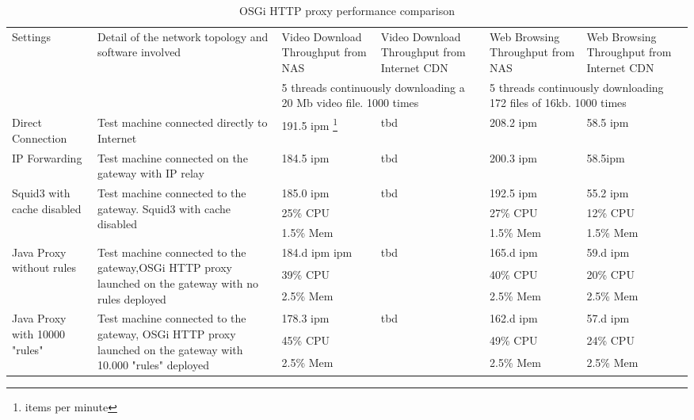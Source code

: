\begin{table*}
	\centering
	\begin{tabular}{|p{}|p{}||p{}|p{}|p{}|p{}|}
		\hline
		\multirow{2}{0.10\textwidth}{Settings} & \multirow{2}{0.35\textwidth}{Detail of the network topology and software involved}   & Video Download Throughput from NAS & Video Download Throughput from Internet CDN      & Web Browsing Throughput from NAS & Web Browsing Throughput from Internet CDN \\ \cline{3-6}
		 & & \multicolumn{2}{m{0.20\textwidth}|}{5 threads continuously downloading a 20 Mb video file. 1000 times} & \multicolumn{2}{m{0.20\textwidth}|}{5 threads continuously downloading 172 files of 16kb. 1000 times}\\\hline\hline
		Direct Connection & Test machine connected directly to Internet & 191.5 ipm \footnote{items per minute} & tbd & 208.2 ipm & 58.5 ipm \\\hline
		IP Forwarding  & Test machine connected on the gateway with IP relay & 184.5 ipm & tbd & 200.3 ipm & 58.5ipm\\\hline
		\multirow{3}{0.10\textwidth}{Squid3 with cache disabled} & \multirow{3}{0.35\textwidth}{
		Test machine connected to the gateway. Squid3 with cache disabled} &185.0 ipm & \multirow{3}{*}{tbd} & 192.5 ipm & 55.2 ipm \\
		 & & 25\% CPU & & 27\% CPU & 12\% CPU \\
		 & & 1.5\% Mem & & 1.5\% Mem & 1.5\% Mem \\\hline
		
		\multirow{3}{0.10\textwidth}{Java Proxy without rules} & \multirow{3}{0.35\textwidth}{
		Test machine connected to the gateway,OSGi HTTP proxy launched on the gateway with no rules deployed} &184.d ipm ipm & \multirow{3}{*}{tbd} & 165.d ipm & 59.d ipm \\
		 & & 39\% CPU & & 40\% CPU & 20\% CPU \\
		 & & 2.5\% Mem & & 2.5\% Mem & 2.5\% Mem \\\hline
		 
		 \multirow{3}{0.10\textwidth}{Java Proxy with 10000 "rules"} & \multirow{3}{0.35\textwidth}{
		Test machine connected to the gateway, OSGi HTTP proxy launched on the gateway with 10.000 "rules" deployed} &178.3 ipm & \multirow{3}{*}{tbd} & 162.d ipm & 57.d ipm \\
		 & & 45\% CPU & & 49\% CPU & 24\% CPU \\
		 & & 2.5\% Mem & & 2.5\% Mem & 2.5\% Mem \\\hline
                                                
	\end{tabular}
	\caption{
	OSGi HTTP proxy performance comparison
	\label{tab:perf-comparison}
	}
	
\end{table*}

